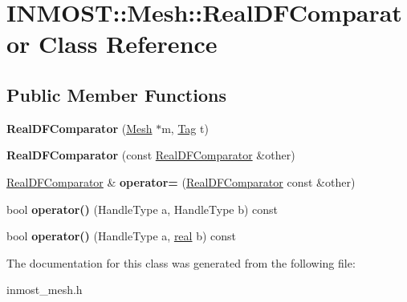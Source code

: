 \hypertarget{classINMOST_1_1Mesh_1_1RealDFComparator}{\section{I\-N\-M\-O\-S\-T\-:\-:Mesh\-:\-:Real\-D\-F\-Comparator Class Reference}
\label{classINMOST_1_1Mesh_1_1RealDFComparator}
}
\subsection*{Public Member Functions}
\begin{DoxyCompactItemize}
\item 
\hypertarget{classINMOST_1_1Mesh_1_1RealDFComparator_a2a794aab1adcd8807f8533c2a52e1ed0}{{\bfseries Real\-D\-F\-Comparator} (\hyperlink{classINMOST_1_1Mesh}{Mesh} $\ast$m, \hyperlink{classINMOST_1_1Tag}{Tag} t)}\label{classINMOST_1_1Mesh_1_1RealDFComparator_a2a794aab1adcd8807f8533c2a52e1ed0}

\item 
\hypertarget{classINMOST_1_1Mesh_1_1RealDFComparator_aa54bc748bbf14f5d75dbf7e6f2a25bbf}{{\bfseries Real\-D\-F\-Comparator} (const \hyperlink{classINMOST_1_1Mesh_1_1RealDFComparator}{Real\-D\-F\-Comparator} \&other)}\label{classINMOST_1_1Mesh_1_1RealDFComparator_aa54bc748bbf14f5d75dbf7e6f2a25bbf}

\item 
\hypertarget{classINMOST_1_1Mesh_1_1RealDFComparator_ad1ba4029090aa609871caf526c7300e7}{\hyperlink{classINMOST_1_1Mesh_1_1RealDFComparator}{Real\-D\-F\-Comparator} \& {\bfseries operator=} (\hyperlink{classINMOST_1_1Mesh_1_1RealDFComparator}{Real\-D\-F\-Comparator} const \&other)}\label{classINMOST_1_1Mesh_1_1RealDFComparator_ad1ba4029090aa609871caf526c7300e7}

\item 
\hypertarget{classINMOST_1_1Mesh_1_1RealDFComparator_a32d2944a800656447a02c967fda7c9e2}{bool {\bfseries operator()} (Handle\-Type a, Handle\-Type b) const }\label{classINMOST_1_1Mesh_1_1RealDFComparator_a32d2944a800656447a02c967fda7c9e2}

\item 
\hypertarget{classINMOST_1_1Mesh_1_1RealDFComparator_aa3e1ba9adb8ed32128a4878f80d708e8}{bool {\bfseries operator()} (Handle\-Type a, \hyperlink{classINMOST_1_1Storage_a853346784b4a5822a7fac54d8f10f805}{real} b) const }\label{classINMOST_1_1Mesh_1_1RealDFComparator_aa3e1ba9adb8ed32128a4878f80d708e8}

\end{DoxyCompactItemize}


The documentation for this class was generated from the following file\-:\begin{DoxyCompactItemize}
\item 
inmost\-\_\-mesh.\-h\end{DoxyCompactItemize}

